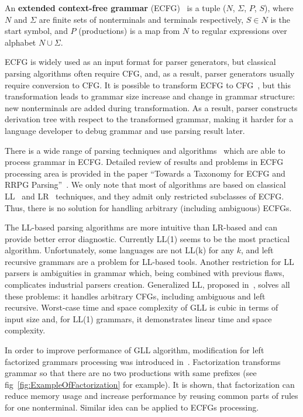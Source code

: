 \documentclass[runningheads,a4paper]{llncs}
\begin{document}
\begin{mydef}
An \textbf{extended context-free grammar} (ECFG)~\cite{ECFG} is a tuple ($N$, $\Sigma$, $P$, $S$), where $N$
and $\Sigma$ are finite sets of nonterminals and terminals respectively, $ S\in N$ is the start symbol,
and $P$ (productions) is a map from $N$ to regular expressions over alphabet $N \cup \Sigma$.
\end{mydef}

ECFG is widely used as an input format for parser generators, but classical parsing algorithms often require CFG, and, as a result, parser generators usually require conversion to CFG.
It is possible to transform ECFG to CFG~\cite{ELL}, but this transformation leads to grammar size 
increase and change in grammar structure: new nonterminals are added during transformation.
As a result, parser constructs derivation tree with respect to the transformed grammar, making it harder for a language developer to debug grammar and use parsing result later.

There is a wide range of parsing techniques and algorithms~\cite{AttributedELL,ELRR,ECFGparsing,ELLParser,ELL,ECFG,ELALR,ELRParsing} which are able to process grammar in ECFG.
Detailed review of results and problems in ECFG processing area is provided in the paper ``Towards a Taxonomy for ECFG and RRPG Parsing''~\cite{ECFG}. 
We only note that most of algorithms are based on classical LL~\cite{ELLParser,AttributedELL,PredictiveECFG} and LR~\cite{ELRParsing,ELALR,ELRR} techniques, and they admit only restricted subclasses of ECFG.
Thus, there is no solution for handling arbitrary (including ambiguous) ECFGs.

The LL-based parsing algorithms are more intuitive than LR-based and can provide better error diagnostic.
Currently LL(1) seems to be the most practical algorithm.
Unfortunately, some languages are not LL(k) for any $k$, and left recursive grammars are a problem for LL-based tools.
Another restriction for LL parsers is ambiguities in grammar which, being combined with previous flaws, complicates industrial parsers creation.
Generalized LL, proposed in~\cite{scott2010gll}, solves all these problems: it handles arbitrary CFGs, including ambiguous and left recursive.  
Worst-case time and space complexity of GLL is cubic in terms of input size and, for LL(1) grammars, it demonstrates linear time and space complexity.

In order to improve performance of GLL algorithm, modification for left factorized grammars processing was introduced in~\cite{scott2016structuring}.
Factorization transforms grammar so that there are no two productions with same prefixes (see fig~\ref{fig:ExampleOfFactorization} for example).
It is shown, that factorization can reduce memory usage and increase performance by reusing common parts of rules for one nonterminal.
Similar idea can be applied to ECFGs processing.
\end{document}
